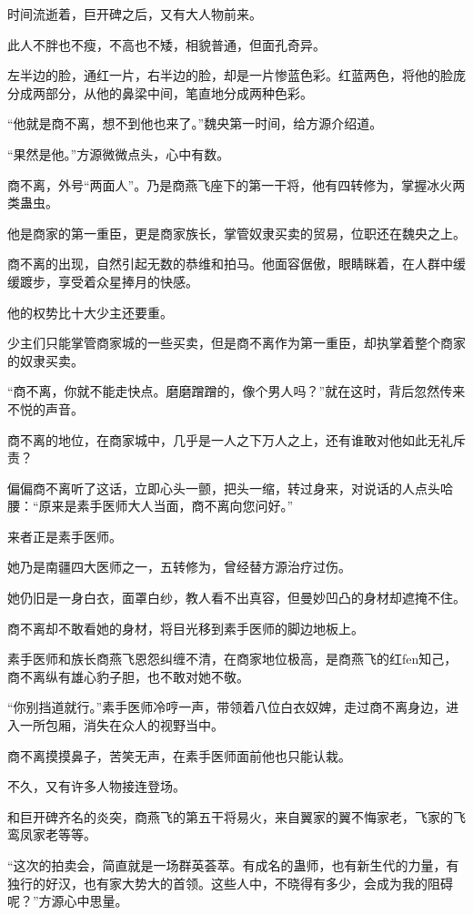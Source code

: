 \begin{this_body}
时间流逝着，巨开碑之后，又有大人物前来。

此人不胖也不瘦，不高也不矮，相貌普通，但面孔奇异。

左半边的脸，通红一片，右半边的脸，却是一片惨蓝色彩。红蓝两色，将他的脸庞分成两部分，从他的鼻梁中间，笔直地分成两种色彩。

“他就是商不离，想不到他也来了。”魏央第一时间，给方源介绍道。

“果然是他。”方源微微点头，心中有数。

商不离，外号“两面人”。乃是商燕飞座下的第一干将，他有四转修为，掌握冰火两类蛊虫。

他是商家的第一重臣，更是商家族长，掌管奴隶买卖的贸易，位职还在魏央之上。

商不离的出现，自然引起无数的恭维和拍马。他面容倨傲，眼睛眯着，在人群中缓缓踱步，享受着众星捧月的快感。

他的权势比十大少主还要重。

少主们只能掌管商家城的一些买卖，但是商不离作为第一重臣，却执掌着整个商家的奴隶买卖。

“商不离，你就不能走快点。磨磨蹭蹭的，像个男人吗？”就在这时，背后忽然传来不悦的声音。

商不离的地位，在商家城中，几乎是一人之下万人之上，还有谁敢对他如此无礼斥责？

偏偏商不离听了这话，立即心头一颤，把头一缩，转过身来，对说话的人点头哈腰：“原来是素手医师大人当面，商不离向您问好。”

来者正是素手医师。

她乃是南疆四大医师之一，五转修为，曾经替方源治疗过伤。

她仍旧是一身白衣，面罩白纱，教人看不出真容，但曼妙凹凸的身材却遮掩不住。

商不离却不敢看她的身材，将目光移到素手医师的脚边地板上。

素手医师和族长商燕飞恩怨纠缠不清，在商家地位极高，是商燕飞的红fen知己，商不离纵有雄心豹子胆，也不敢对她不敬。

“你别挡道就行。”素手医师冷哼一声，带领着八位白衣奴婢，走过商不离身边，进入一所包厢，消失在众人的视野当中。

商不离摸摸鼻子，苦笑无声，在素手医师面前他也只能认栽。

不久，又有许多人物接连登场。

和巨开碑齐名的炎突，商燕飞的第五干将易火，来自翼家的翼不悔家老，飞家的飞鸾凤家老等等。

“这次的拍卖会，简直就是一场群英荟萃。有成名的蛊师，也有新生代的力量，有独行的好汉，也有家大势大的首领。这些人中，不晓得有多少，会成为我的阻碍呢？”方源心中思量。


\end{this_body}
